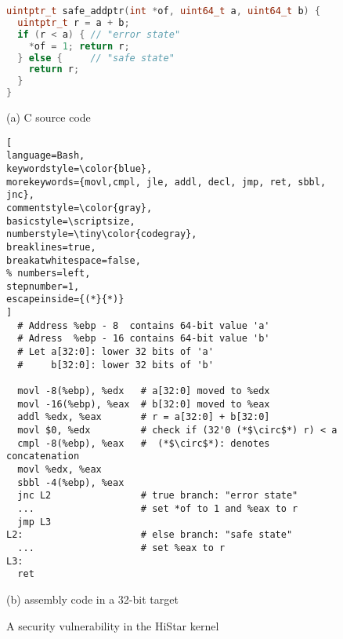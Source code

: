 \begin{figure}
\begin{lstlisting}[language=C++, basicstyle=\scriptsize,keywordstyle=\color{blue},breaklines=true,
breakatwhitespace=false,morekeywords={uintptr_t,uint64_t},commentstyle=\color{gray},]
uintptr_t safe_addptr(int *of, uint64_t a, uint64_t b) {
  uintptr_t r = a + b;
  if (r < a) { // "error state" 
    *of = 1; return r;
  } else {     // "safe state" 
    return r;
  }
}
\end{lstlisting}
\vspace{-10pt}
\begin{center}
{\small (a) C source code}
\end{center}
\begin{lstlisting}[
language=Bash,
keywordstyle=\color{blue},
morekeywords={movl,cmpl, jle, addl, decl, jmp, ret, sbbl, jnc},
commentstyle=\color{gray},
basicstyle=\scriptsize,
numberstyle=\tiny\color{codegray},
breaklines=true,
breakatwhitespace=false,
% numbers=left,
stepnumber=1,
escapeinside={(*}{*)}
]
  # Address %ebp - 8  contains 64-bit value 'a'  
  # Adress  %ebp - 16 contains 64-bit value 'b'
  # Let a[32:0]: lower 32 bits of 'a' 
  #     b[32:0]: lower 32 bits of 'b'
  
  movl -8(%ebp), %edx   # a[32:0] moved to %edx
  movl -16(%ebp), %eax  # b[32:0] moved to %eax
  addl %edx, %eax       # r = a[32:0] + b[32:0]
  movl $0, %edx         # check if (32'0 (*$\circ$*) r) < a
  cmpl -8(%ebp), %eax   #  (*$\circ$*): denotes concatenation
  movl %edx, %eax
  sbbl -4(%ebp), %eax
  jnc L2                # true branch: "error state"
  ...                   # set *of to 1 and %eax to r
  jmp L3
L2:                     # else branch: "safe state"
  ...                   # set %eax to r
L3:
  ret
\end{lstlisting}
\vspace{-15pt}
\begin{center}
{\small (b) \ISA assembly code in a 32-bit target}
\end{center}
\caption{A security vulnerability in the HiStar kernel}
\label{fig:histar}
\end{figure}

